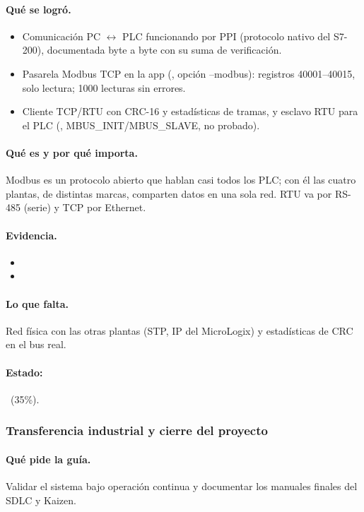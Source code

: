 \documentclass[a4paper,11pt]{article}
\begin{document}
\paragraph{Qué se logró.}
\begin{itemize}
\item Comunicación PC $\leftrightarrow$ PLC funcionando por PPI (protocolo nativo del S7-200), documentada byte a byte con su suma de verificación.
\item Pasarela Modbus TCP en la app (, opción --modbus): registros 40001–40015, solo lectura; 1000 lecturas sin errores.
\item Cliente TCP/RTU con CRC-16 y estadísticas de tramas, y esclavo RTU para el PLC (, MBUS\_INIT/MBUS\_SLAVE, no probado).
\end{itemize}
\paragraph{Qué es y por qué importa.} Modbus es un protocolo abierto que hablan casi todos los PLC; con él las cuatro plantas, de distintas marcas, comparten datos en una sola red. RTU va por RS-485 (serie) y TCP por Ethernet.
\paragraph{Evidencia.}
\begin{itemize}\small
\item {}
\item {}
\end{itemize}
\paragraph{Lo que falta.} Red física con las otras plantas (STP, IP del MicroLogix) y estadísticas de CRC en el bus real.
\paragraph{Estado:} \parcial~(35\%).
\subsubsection{Transferencia industrial y cierre del proyecto}
\paragraph{Qué pide la guía.} Validar el sistema bajo operación continua y documentar los manuales finales del SDLC y Kaizen.
\end{document}
